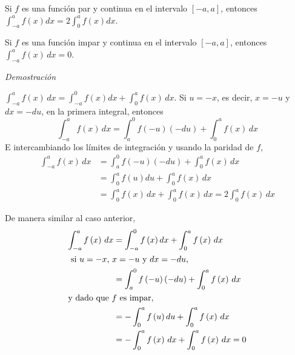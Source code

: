 \begin{teorema}\leavevmode\par
\begin{parrafonumerado}[label={\alph*)}]
\item Si $f$ es una función par y continua en el intervalo $\left[ -a,a\right]$, entonces ${\int_{-a}^{a}f\left( x\right)dx=2\int_{0}^{a}f\left( x\right)dx}$.\label{par:1}
\item Si $f$ es una función impar y continua en el intervalo $\left[ -a,a\right]$, entonces ${\int_{-a}^{a}f\left( x\right)\,dx=0}$.\label{par:2}
\end{parrafonumerado}
\end{teorema}


\emph{Demostración}

\begin{parrafonumerado}[label={\alph*)}]

\item ${\int_{-a}^{a}f\left( x\right)\,dx=\int_{-a}^{0}f\left( x\right)
dx+\int_{0}^{a}f\left( x\right)\,dx}$. Si $u=-x$, es decir, $x=-u$ y $dx=-du$, en la primera integral, entonces
\[\int_{-a}^{a}f\left( x\right)\,dx=\int_{a}^{0}f\left( -u\right) \left( -du\right) +\int_{0}^{a}f\left( x\right)\,dx\]
E intercambiando los límites de integración y usando la paridad de $f$,
\begin{align*}
\int_{-a}^{a}f\left( x\right)\,dx&=\int_{a}^{0}f\left( -u\right) \left( -du\right) +\int_{0}^{a}f\left( x\right)\,dx\\
&=\int_{0}^{a}f\left( u\right) du+\int_{0}^{a}f\left( x\right)\,dx\\
&=\int_{0}^{a}f\left( x\right)\,dx+\int_{0}^{a}f\left( x\right)\,dx=2\int_{0}^{a}f\left( x\right)\,dx
\end{align*}

\item De manera similar al caso anterior,
\begin{align*}
\int_{-a}^{a}f\left( x\right)\,dx&=\int_{-a}^{0}f\left( x\right)dx+\int_{0}^{a}f\left( x\right)\,dx\\
\intertext{ si $u=-x$, $x=-u$ y $dx=-du$,}
&=\int_{a}^{0}f\left( -u\right) \left( -du\right) +\int_{0}^{a}f\left(x\right)\,dx\\
\intertext{y dado que $f$ es impar,}
&=-\int_{0}^{a}f\left( u\right) du+\int_{0}^{a}f\left( x\right)\,dx\\
&=-\int_{0}^{a}f\left( x\right)\,dx+\int_{0}^{a}f\left( x\right)\,dx=0
\end{align*}
\end{parrafonumerado}

